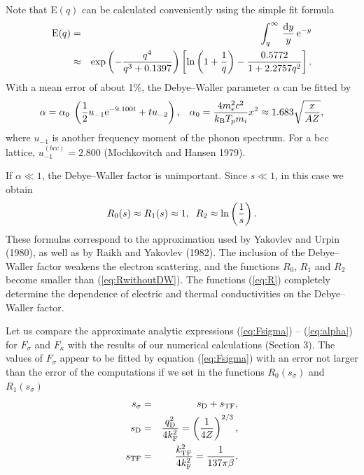 Note that E$(q)$ can be calculated conveniently using the simple fit
formula
%
\begin{eqnarray}
   {\rm E}(q) & = & \int_q^\infty \, { \mbox{d} y \over y} \, {\rm e}^{-y}
\nonumber \\
     & \approx & \exp \left( -{q^4 \over q^3 + 0.1397} \right)
     \left[ \ln \left(  1+ { 1 \over q} \right)
    - {0.5772 \over 1+2.2757q^2} \right] .
\label{eq:E}
\end{eqnarray}
%
With a mean error of about 1\%, the Debye--Waller parameter 
$\alpha$ can be fitted by 
%
\begin{equation}
     \alpha = \alpha_0  \;
             \left( {1 \over 2} u_{-1} {\rm e}^{-9.100t}+tu_{-2} \right),
     \; \; \;
     \alpha_0 = {4 m_e^2c^2 \over k_{\rm B} T_p m_i} x^2
        \approx 1.683 \sqrt{ { x \over AZ} },
\label{eq:alpha}
\end{equation}
%
where $u_{-1}$ is another frequency moment of the phonon spectrum. For a
bcc lattice, $u_{-1}^{(bcc)} = 2.800$ (Mochkovitch and Hansen 1979).

If $\alpha \ll 1$, the Debye--Waller factor is unimportant. Since
$s \ll 1$, in this case we obtain
%
\begin{equation}
    R_0(s) \approx R_1(s) \approx 1, \; \;
    R_2 \approx \ln \left( {1 \over s } \right).
\label{eq:RwithoutDW}
\end{equation}
%
These formulas correspond to the approximation used by Yakovlev
and Urpin (1980), as well as by Raikh and Yakovlev (1982). The
inclusion of the Debye--Waller factor weakens the electron
scattering, and the functions $R_0$, $R_1$ and $R_2$ become smaller
than (\ref{eq:RwithoutDW}). The functions (\ref{eq:R}) completely determine 
the dependence of electric and thermal conductivities on 
the Debye--Waller factor.

Let us compare the approximate analytic expressions (\ref{eq:Fsigma}) -- 
(\ref{eq:alpha}) for $F_\sigma$ and $F_\kappa$ with the results 
of our numerical calculations (Section 3). The values of $F_\sigma$
appear to be fitted by equation (\ref{eq:Fsigma})
with an error not larger than the error of the
computations if we set in the functions $R_0(s_\sigma)$ and $R_1(s_\sigma)$
%
\begin{eqnarray}
      s_\sigma & = & s_{\rm D} + s_{\rm TF},
\label{eq:s_sigma} \\
      s_{\rm D} & = & { q_{\rm D}^2 \over 4 k_{\rm F}^2}
                = \left( {1 \over 4Z } \right)^{2/3},
\label{eq:sD} \\
      s_{\rm TF} & = & { k_{\rm TF}^2 \over 4 k_{\rm F}^2}
                 = {1 \over 137 \pi \beta}.
\label{eq:sTF}
\end{eqnarray}
%

